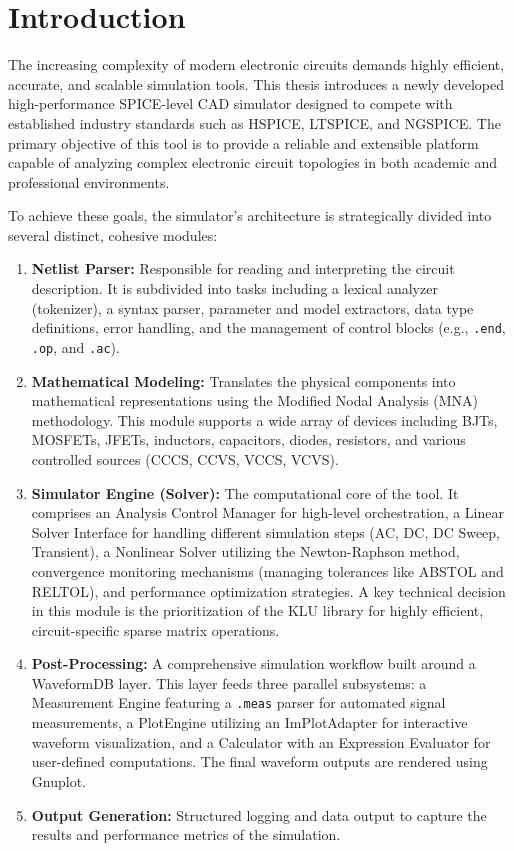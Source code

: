 \setlength{\parskip}{\baselineskip}

\section{Introduction}
The increasing complexity of modern electronic circuits demands highly efficient, accurate, and scalable simulation tools. This thesis introduces a newly developed high-performance SPICE-level CAD simulator designed to compete with established industry standards such as HSPICE, LTSPICE, and NGSPICE. The primary objective of this tool is to provide a reliable and extensible platform capable of analyzing complex electronic circuit topologies in both academic and professional environments.

To achieve these goals, the simulator's architecture is strategically divided into several distinct, cohesive modules:
\begin{enumerate}
    \item \textbf{Netlist Parser:} Responsible for reading and interpreting the circuit description. It is subdivided into tasks including a lexical analyzer (tokenizer), a syntax parser, parameter and model extractors, data type definitions, error handling, and the management of control blocks (e.g., \texttt{.end}, \texttt{.op}, and \texttt{.ac}).
    \item \textbf{Mathematical Modeling:} Translates the physical components into mathematical representations using the Modified Nodal Analysis (MNA) methodology. This module supports a wide array of devices including BJTs, MOSFETs, JFETs, inductors, capacitors, diodes, resistors, and various controlled sources (CCCS, CCVS, VCCS, VCVS).
    \item \textbf{Simulator Engine (Solver):} The computational core of the tool. It comprises an Analysis Control Manager for high-level orchestration, a Linear Solver Interface for handling different simulation steps (AC, DC, DC Sweep, Transient), a Nonlinear Solver utilizing the Newton-Raphson method, convergence monitoring mechanisms (managing tolerances like ABSTOL and RELTOL), and performance optimization strategies. A key technical decision in this module is the prioritization of the KLU library for highly efficient, circuit-specific sparse matrix operations.
    \item \textbf{Post-Processing:} A comprehensive simulation workflow built around a WaveformDB layer. This layer feeds three parallel subsystems: a Measurement Engine featuring a \texttt{.meas} parser for automated signal measurements, a PlotEngine utilizing an ImPlotAdapter for interactive waveform visualization, and a Calculator with an Expression Evaluator for user-defined computations. The final waveform outputs are rendered using Gnuplot.
    \item \textbf{Output Generation:} Structured logging and data output to capture the results and performance metrics of the simulation.
\end{enumerate}

